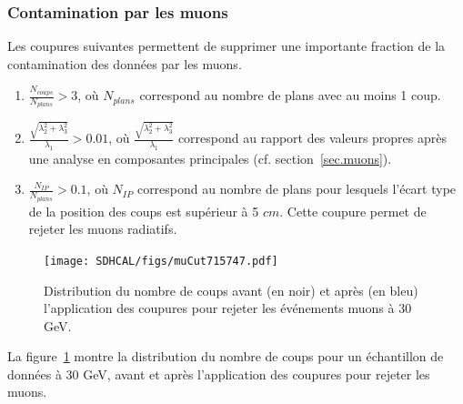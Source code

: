 \subsubsection{Contamination par les muons}
Les coupures suivantes permettent de supprimer une importante fraction de la contamination des données par les muons.
\begin{enumerate}[-]
\item $\frac{N_{coups}}{N_{plans}}>3$, où $N_{plans}$ correspond au nombre de plans avec au moins 1 coup.
\item $\frac{\sqrt{\lambda_2^2+\lambda_3^2}}{\lambda_1}>0.01$, où $\frac{\sqrt{\lambda_2^2+\lambda_3^2}}{\lambda_1}$ correspond au rapport des valeurs propres après une analyse en composantes principales (cf. section~\ref{sec.muons}).
\item $\frac{N_{IP}}{N_{plans}}>0.1$, où $N_{IP}$ correspond au nombre de plans pour lesquels l'écart type de la position des coups est supérieur à 5 $cm$. Cette coupure permet de rejeter les muons radiatifs. 
\end{enumerate}
\begin{figure}[!h]
  \begin{center}
    \texttt{[image: SDHCAL/figs/muCut715747.pdf]}
    \caption{Distribution du nombre de coups avant (en noir) et après (en bleu) l'application des coupures pour rejeter les événements muons à 30 GeV.}
    \label{fig:muCut}
  \end{center}
\end{figure}
La figure~\ref{fig:muCut} montre la distribution du nombre de coups pour un échantillon de données à 30 GeV, avant et après l'application des coupures pour rejeter les muons.
